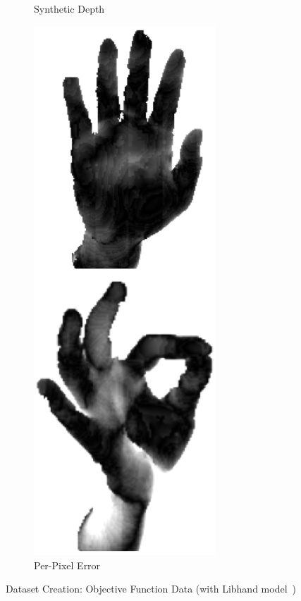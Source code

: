 \begin{figure}[ht]
\begin{subfigure}{0.25\textwidth}
                \caption{\footnotesize Synthetic Depth}
        \end{subfigure}
        \begin{subfigure}{0.25\textwidth}
                \centering
                \includegraphics[width=0.75\textwidth]{figures_1_hand_tracking/Residue_tiled}
                \caption{\footnotesize Per-Pixel Error}
        \end{subfigure}
        \caption{Dataset Creation: Objective Function Data (with Libhand model~\protect\cite{libhand})}
        \label{fig:pso}
\end{figure}

